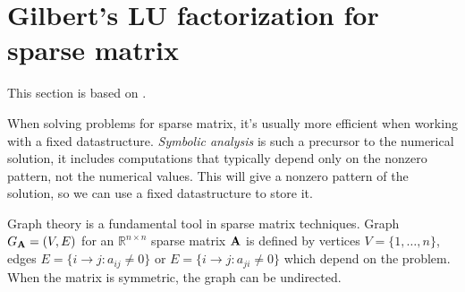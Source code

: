 \section{Gilbert's LU factorization for sparse matrix}
This section is based on \cite{Gilbert1988}.

\begin{defn}
    When solving problems for sparse matrix, it's usually 
    more efficient when working with a fixed datastructure. 
    \textit{Symbolic analysis} is such a precursor to the 
    numerical solution, it includes computations that 
    typically depend only on the nonzero pattern, not the 
    numerical values. This will give a nonzero pattern of the 
    solution, so we can use a fixed datastructure to 
    store it.
\end{defn}

\begin{defn}
    Graph theory is a fundamental tool in sparse matrix 
    techniques. Graph $G_{\mathbf{A}}=(V,E)$ for an 
    $\mathbb{R}^{n\times n}$ sparse matrix ${\mathbf{A}}$ is defined by 
    vertices $V=\{1,\ldots,n\}$, edges $E=\{i\rightarrow j:
    a_{ij}\neq 0\}$ or $E=\{i\rightarrow j:a_{ji}\neq 0\}$ which 
    depend on the problem. When the matrix is symmetric, the 
    graph can be undirected. 
\end{defn}


